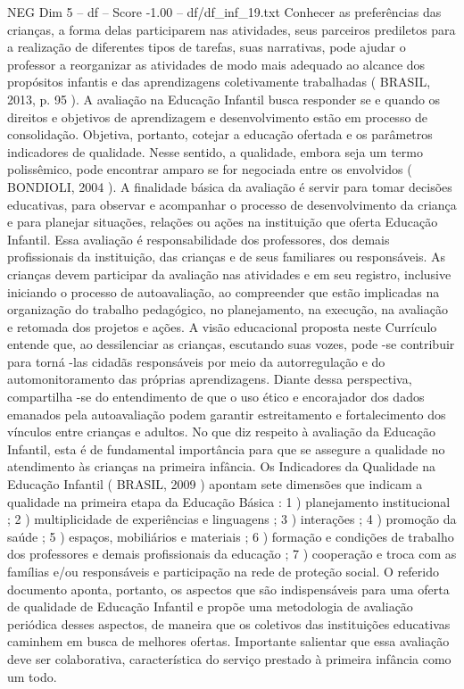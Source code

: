 \begin{textsample}{NEG Dim 5 – df – Score -1.00 – df/df\_inf\_19.txt}
Conhecer as preferências das crianças, a forma delas participarem nas atividades, seus parceiros prediletos para a realização de diferentes tipos de tarefas, suas narrativas, pode ajudar o professor a reorganizar as atividades de modo mais adequado ao alcance dos propósitos infantis e das aprendizagens coletivamente trabalhadas ( BRASIL, 2013, p. 95 ).
A avaliação na Educação Infantil busca responder se e quando os direitos e objetivos de aprendizagem e desenvolvimento estão em processo de consolidação.
Objetiva, portanto, cotejar a educação ofertada e os parâmetros indicadores de qualidade.
Nesse sentido, a qualidade, embora seja um termo polissêmico, pode encontrar amparo se for negociada entre os envolvidos ( BONDIOLI, 2004 ).
A finalidade básica da avaliação é servir para tomar decisões educativas, para observar e acompanhar o processo de desenvolvimento da criança e para planejar situações, relações ou ações na instituição que oferta Educação Infantil.
Essa avaliação é responsabilidade dos professores, dos demais profissionais da instituição, das crianças e de seus familiares ou responsáveis.
As crianças devem participar da avaliação nas atividades e em seu registro, inclusive iniciando o processo de autoavaliação, ao compreender que estão implicadas na organização do trabalho pedagógico, no planejamento, na execução, na avaliação e retomada dos projetos e ações.
A visão educacional proposta neste Currículo entende que, ao dessilenciar as crianças, escutando suas vozes, pode -se contribuir para torná -las cidadãs responsáveis por meio da autorregulação e do automonitoramento das próprias aprendizagens.
Diante dessa perspectiva, compartilha -se do entendimento de que o uso ético e encorajador dos dados emanados pela autoavaliação podem garantir estreitamento e fortalecimento dos vínculos entre crianças e adultos.
No que diz respeito à avaliação da Educação Infantil, esta é de fundamental importância para que se assegure a qualidade no atendimento às crianças na primeira infância.
Os Indicadores da Qualidade na Educação Infantil ( BRASIL, 2009 ) apontam sete dimensões que indicam a qualidade na primeira etapa da Educação Básica : 1 ) planejamento institucional ; 2 ) multiplicidade de experiências e linguagens ; 3 ) interações ; 4 ) promoção da saúde ; 5 ) espaços, mobiliários e materiais ; 6 ) formação e condições de trabalho dos professores e demais profissionais da educação ; 7 ) cooperação e troca com as famílias e/ou responsáveis e participação na rede de proteção social.
O referido documento aponta, portanto, os aspectos que são indispensáveis para uma oferta de qualidade de Educação Infantil e propõe uma metodologia de avaliação periódica desses aspectos, de maneira que os coletivos das instituições educativas caminhem em busca de melhores ofertas.
Importante salientar que essa avaliação deve ser colaborativa, característica do serviço prestado à primeira infância como um todo.

\end{textsample}
